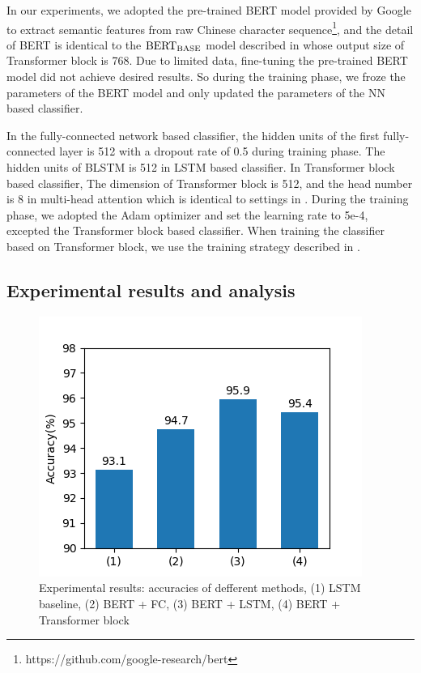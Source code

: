 \documentclass[a4paper]{article}
\begin{document}
In our experiments, we adopted the pre-trained BERT model provided by Google to extract semantic features from raw Chinese character sequence\footnote{https://github.com/google-research/bert}, and the detail of BERT is identical to the $\rm BERT_{BASE}$ model described in \cite{devlin2018bert} whose output size of Transformer block is 768. Due to limited data, fine-tuning the pre-trained BERT model did not achieve desired results. So during the training phase, we froze the parameters of the BERT model and only updated the parameters of the NN based classifier.

In the fully-connected network based classifier, the hidden units of the first fully-connected layer is 512 with a dropout rate of 0.5 during training phase. The hidden units of BLSTM is  512 in LSTM based classifier. In Transformer block based classifier, The dimension of Transformer block is 512, and the head number is 8 in multi-head attention which is identical to settings in \cite{vaswani2017attention}. During the training phase, we adopted the Adam\cite{kingma2014adam} optimizer and set the learning rate to 5e-4, excepted the Transformer block based classifier. When training the classifier based on Transformer block, we use the training strategy described in \cite{vaswani2017attention}.


\subsection{Experimental results and analysis}

\begin{figure}[t]
	\centering
	\includegraphics[scale=0.4]{pics/acc.png}
	\caption{Experimental results: accuracies of defferent methods, (1) LSTM baseline, (2) BERT + FC, (3) BERT + LSTM, (4) BERT + Transformer block}
	\label{fig:acc}
\end{figure}
\end{document}
